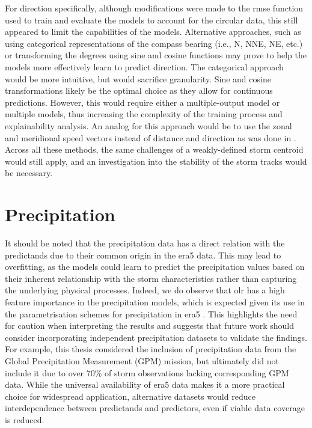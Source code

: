 For direction specifically, although modifications were made to the \acrshort{rmse} function used to train and evaluate the models to account for the circular data, this still appeared to limit the capabilities of the models. Alternative approaches, such as using categorical representations of the compass bearing (i.e., N, NNE, NE, etc.) or transforming the degrees using sine and cosine functions may prove to help the models more effectively learn to predict direction. The categorical approach would be more intuitive, but would sacrifice granularity. Sine and cosine transformations likely be the optimal choice as they allow for continuous predictions. However, this would require either a multiple-output model or multiple models, thus increasing the complexity of the training process and explainability analysis. An analog for this approach would be to use the zonal and meridional speed vectors instead of distance and direction as was done in \cite{Hunt2024}. Across all these methods, the same challenges of a weakly-defined storm centroid would still apply, and an investigation into the stability of the storm tracks would be necessary.

\section{Precipitation}

It should be noted that the precipitation data has a direct relation with the predictands due to their common origin in the \acrshort{era5} data. This may lead to overfitting, as the models could learn to predict the precipitation values based on their inherent relationship with the storm characteristics rather than capturing the underlying physical processes. Indeed, we do observe that \acrshort{olr} has a high feature importance in the precipitation models, which is expected given its use in the parametrisation schemes for precipitation in \acrshort{era5} \citep{Hersbach2020}. This highlights the need for caution when interpreting the results and suggests that future work should consider incorporating independent precipitation datasets to validate the findings. For example, this thesis considered the inclusion of precipitation data from the Global Precipitation Measurement (GPM) mission, but ultimately did not include it due to over 70\% of storm observations lacking corresponding GPM data. While the universal availability of \acrshort{era5} data makes it a more practical choice for widespread application, alternative datasets would reduce interdependence between predictands and predictors, even if viable data coverage is reduced.

